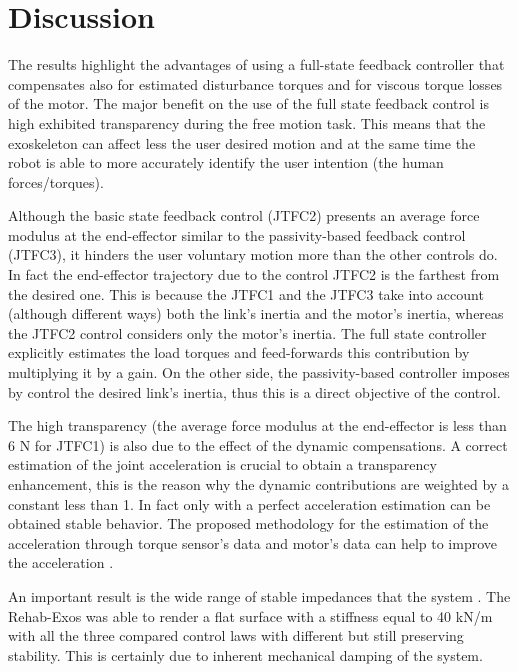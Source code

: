 \section{Discussion} \label{sec:discussion}

The results highlight the advantages of using a full-state feedback controller that compensates also for estimated disturbance torques and for viscous torque losses of the motor. The major benefit on the use of the full state feedback control is high exhibited transparency during the free motion task. This means that the exoskeleton can affect less the user desired motion and at the same time the robot is able to more accurately identify the user intention (the human forces/torques).
\par Although the basic state feedback control (JTFC2) presents an average force modulus at the end-effector similar to the passivity-based feedback control (JTFC3), it hinders the user voluntary motion more than the other controls do. In fact the end-effector trajectory due to the control JTFC2 is the farthest from the desired one. This is because the JTFC1 and the JTFC3 take into account (although different ways) both the link's inertia and the motor's inertia, whereas the JTFC2 control considers only the motor's inertia. The full state controller explicitly estimates the load torques and feed-forwards this contribution by multiplying it by a gain. On the other side, the passivity-based controller imposes by control the desired link's inertia, thus this is a direct objective of the control.
\par The high transparency (the average force modulus at the end-effector is less than 6 N for JTFC1) is also due to the effect of the dynamic compensations. A correct estimation of the joint acceleration is crucial to obtain a transparency enhancement, this is the reason why the dynamic contributions are weighted by a constant less than 1. In fact only with a perfect acceleration estimation \DIFdelbegin {}\DIFdelend \DIFaddbegin {}\DIFaddend can be obtained  \DIFdelbegin {}\DIFdelend \DIFaddbegin {}\DIFaddend stable behavior. The proposed methodology for the estimation of the acceleration through torque sensor's data and motor's data can help to improve the acceleration \DIFdelbegin {}\DIFdelend \DIFaddbegin {}\DIFaddend .
\par An important result is the wide range of stable impedances that the system \DIFdelbegin {}\DIFdelend \DIFaddbegin {}\DIFaddend . The Rehab-Exos was able to render a flat surface with a stiffness equal to 40 kN/m with all the three compared control laws with different \DIFdelbegin {}\DIFdelend \DIFaddbegin {}\DIFaddend but still preserving stability. This is certainly due to inherent mechanical damping of the system.
